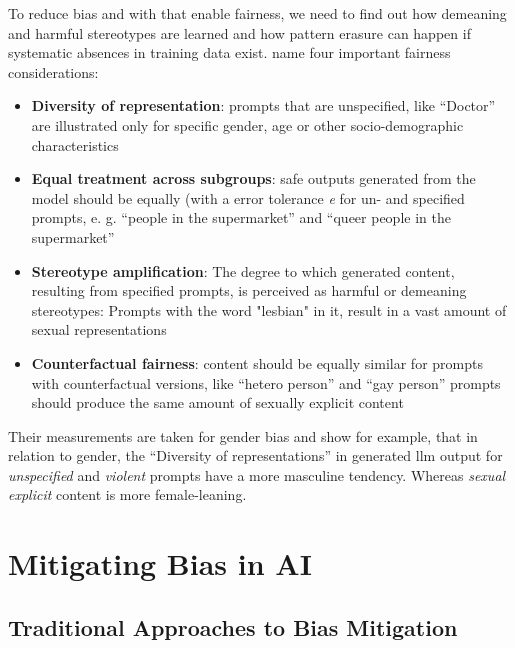 
To reduce bias and with that enable fairness, we need to find out how demeaning and harmful stereotypes are learned and how pattern erasure can happen if systematic absences in training data exist. \citet{hao2023safety} name four important fairness considerations: 
 \begin{itemize}
     \item \textbf{Diversity of representation}: prompts that are unspecified, like \enquote{Doctor} are illustrated only for specific gender, age or other socio-demographic characteristics 
     \item \textbf{Equal treatment across subgroups}: safe outputs generated from the model should be equally (with a error tolerance \textit{e} for un- and specified prompts, e. g. \enquote{people in the supermarket} and \enquote{queer people in the supermarket}
     \item \textbf{Stereotype amplification}: The degree to which generated content, resulting from specified prompts, is perceived as harmful or demeaning stereotypes: Prompts with the word "lesbian" in it, result in a vast amount of sexual representations 
     \item \textbf{Counterfactual fairness}: content should be equally similar for prompts with counterfactual versions, like \enquote{hetero person} and \enquote{gay person} prompts should produce the same amount of sexually explicit content
 \end{itemize}

 Their measurements are taken for gender bias and show for example, that in relation to gender, the \enquote{Diversity of representations} in generated \acrshort{llm} output for \textit{unspecified} and \textit{violent} prompts have a more masculine tendency. Whereas \textit{sexual explicit} content is more female-leaning. 


\section{Mitigating Bias in AI}

\subsection{Traditional Approaches to Bias Mitigation}
\label{subsec:biasmitigation}

